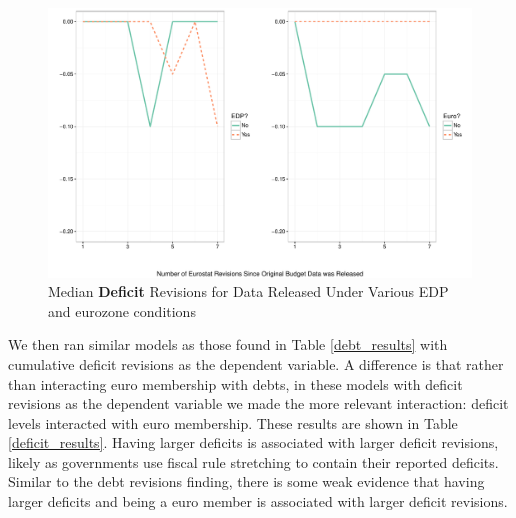 \documentclass[]{article}
\begin{document}
\begin{figure}
    \begin{center}
        \caption{Median \textbf{Deficit} Revisions for Data Released Under Various EDP and eurozone conditions}
        \label{median_deficit_revisions_euro_edp}
        \includegraphics[scale=0.55]{figures/median_deficit_revisions_edp_euro.pdf}
    \end{center}
\end{figure}


We then ran similar models as those found in Table \ref{debt_results} with cumulative deficit revisions as the dependent variable. A difference is that rather than interacting euro membership with debts, in these models with deficit revisions as the dependent variable we made the more relevant interaction: deficit levels interacted with euro membership. These results are shown in Table \ref{deficit_results}. Having larger deficits is associated with larger deficit revisions, likely as governments use fiscal rule stretching to contain their reported deficits.  Similar to the debt revisions finding, there is some weak evidence that having larger deficits and being a euro member is associated with larger deficit revisions.

\begin{landscape}
    
\end{landscape}
\end{document}
